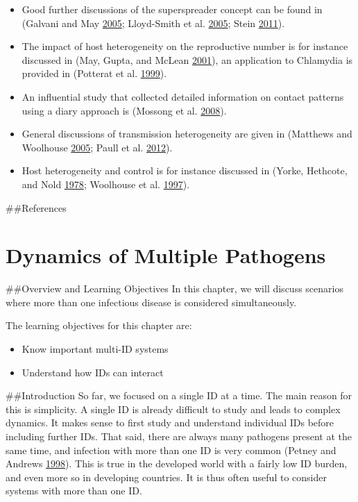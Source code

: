 \documentclass[]{book}
\providecommand{\tightlist}{%
  \setlength{\itemsep}{0pt}\setlength{\parskip}{0pt}}
\theoremstyle{definition}
\theoremstyle{definition}
\theoremstyle{definition}
\theoremstyle{remark}
\begin{document}
\begin{itemize}
\tightlist
\item
  Good further discussions of the superspreader concept can be found in
  (Galvani and May \protect\hyperlink{ref-galvani05}{2005}; Lloyd-Smith
  et al. \protect\hyperlink{ref-lloyd-smith05}{2005}; Stein
  \protect\hyperlink{ref-stein11}{2011}).
\item
  The impact of host heterogeneity on the reproductive number is for
  instance discussed in (May, Gupta, and McLean
  \protect\hyperlink{ref-may01}{2001}), an application to Chlamydia is
  provided in (Potterat et al.
  \protect\hyperlink{ref-potterat99}{1999}).
\item
  An influential study that collected detailed information on contact
  patterns using a diary approach is (Mossong et al.
  \protect\hyperlink{ref-mossong08}{2008}).
\item
  General discussions of transmission heterogeneity are given in
  (Matthews and Woolhouse \protect\hyperlink{ref-matthews05}{2005};
  Paull et al. \protect\hyperlink{ref-paull12}{2012}).
\item
  Host heterogeneity and control is for instance discussed in (Yorke,
  Hethcote, and Nold \protect\hyperlink{ref-yorke78}{1978}; Woolhouse et
  al. \protect\hyperlink{ref-woolhouse97}{1997}).
\end{itemize}

\#\#References

\hypertarget{dynamics-of-multiple-pathogens}{%
\chapter{Dynamics of Multiple
Pathogens}\label{dynamics-of-multiple-pathogens}}

\#\#Overview and Learning Objectives In this chapter, we will discuss
scenarios where more than one infectious disease is considered
simultaneously.

The learning objectives for this chapter are:

\begin{itemize}
\tightlist
\item
  Know important multi-ID systems
\item
  Understand how IDs can interact
\end{itemize}

\#\#Introduction So far, we focused on a single ID at a time. The main
reason for this is simplicity. A single ID is already difficult to study
and leads to complex dynamics. It makes sense to first study and
understand individual IDs before including further IDs. That said, there
are always many pathogens present at the same time, and infection with
more than one ID is very common (Petney and Andrews
\protect\hyperlink{ref-petney98}{1998}). This is true in the developed
world with a fairly low ID burden, and even more so in developing
countries. It is thus often useful to consider systems with more than
one ID.
\end{document}
